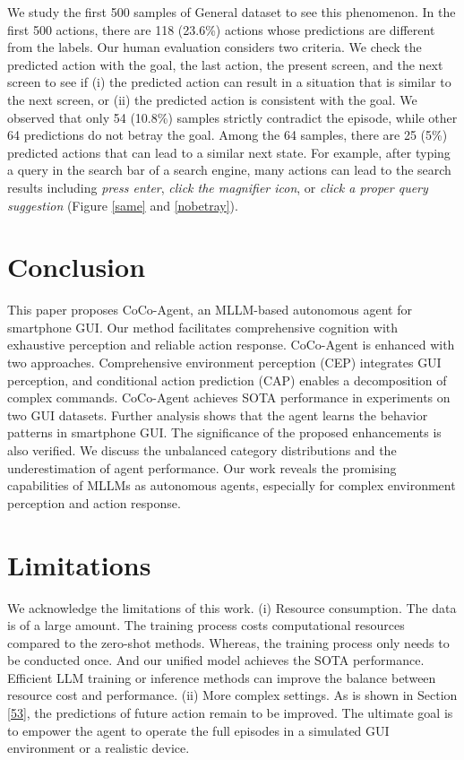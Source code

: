 We study the first 500 samples of General dataset to see this phenomenon. In the first 500 actions, there are 118 (23.6\%) actions whose predictions are different from the labels. Our human evaluation considers two criteria. We check the predicted action with the goal, the last action, the present screen, and the next screen to see if (i) the predicted action can result in a situation that is similar to the next screen, or (ii) the predicted action is consistent with the goal.
We observed that only 54 (10.8\%) samples strictly contradict the episode, while other 64 predictions do not betray the goal. Among the 64 samples, there are 25 (5\%) predicted actions that can lead to a similar next state. 
For example, after typing a query in the search bar of a search engine, many actions can lead to the search results including \textit{press enter}, \textit{click the magnifier icon}, or \textit{click a proper query suggestion} (Figure \ref{same} and \ref{nobetray}).

\section{Conclusion}
This paper proposes CoCo-Agent, an MLLM-based autonomous agent for smartphone GUI.
Our method facilitates comprehensive cognition with exhaustive perception and reliable action response. 
CoCo-Agent is enhanced with two approaches. Comprehensive environment perception (CEP) integrates GUI perception, and conditional action prediction (CAP) enables a decomposition of complex commands.
CoCo-Agent achieves SOTA performance in experiments on two GUI datasets.
Further analysis shows that the agent learns the behavior patterns in smartphone GUI.
The significance of the proposed enhancements is also verified.
We discuss the unbalanced category distributions and the underestimation of agent performance.
Our work reveals the promising capabilities of MLLMs as autonomous agents, especially for complex environment perception and action response.

\section*{Limitations}
We acknowledge the limitations of this work.
(i) Resource consumption. The data is of a large amount. The training process costs computational resources compared to the zero-shot methods. Whereas, the training process only needs to be conducted once. And our unified model achieves the SOTA performance. 
Efficient LLM training or inference methods can improve the balance between resource cost and performance.
(ii) More complex settings. As is shown in Section \ref{53}, the predictions of future action remain to be improved. The ultimate goal is to empower the agent to operate the full episodes in a simulated GUI environment or a realistic device.

